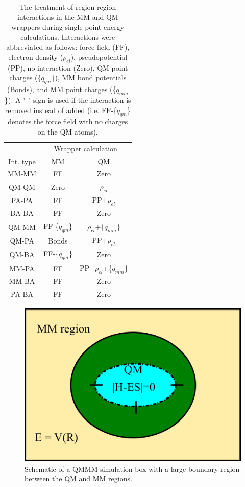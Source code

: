 \documentclass[12pt]{report}
\begin{document}
\begin{table}[hbt]
 \centering
 \begin{tabular}{|c|c c|}
 \hline
  & \multicolumn{2}{|c|}{Wrapper calculation} \\
 Int. type & MM & QM \\ \hline
 MM-MM & FF & Zero \\
 QM-QM & Zero & $\rho_{el}$ \\
 PA-PA & FF & PP+$\rho_{el}$ \\
 BA-BA & FF & Zero \\
 QM-MM & FF-\{$q_{qm}$\} & $\rho_{el}$+\{$q_{mm}$\} \\
 QM-PA & Bonds & PP+$\rho_{el}$ \\
 QM-BA & FF-\{$q_{qm}$\} & Zero \\
 MM-PA & FF & PP+$\rho_{el}$+\{$q_{mm}$\} \\
 MM-BA & FF & Zero \\
 PA-BA & FF & Zero \\ \hline
 \end{tabular}
 \caption{The treatment of region-region interactions in the MM and QM 
 wrappers during single-point energy calculations. Interactions were 
 abbreviated as follows: force field (FF), electron density ($\rho_{el}$),
 pseudopotential (PP), no interaction (Zero), QM point charges 
 (\{$q_{qm}$\}), MM bond potentials (Bonds), and MM point charges
 (\{$q_{mm}$\}). A "-" sign is used if the interaction is removed instead of
 added (i.e. FF-\{$q_{qm}$\} denotes the force field with no charges on the
 QM atoms).} 
 \label{tab:IntTable}
\end{table}

\begin{figure}[hbt]
 \centering  
 \includegraphics[scale=0.50]{../doc/images/QMMM_3.png}
 \caption{Schematic of a QMMM simulation box with a large boundary region
 between the QM and MM regions.}
 \label{fig:QMMM3}
\end{figure}
\end{document}
